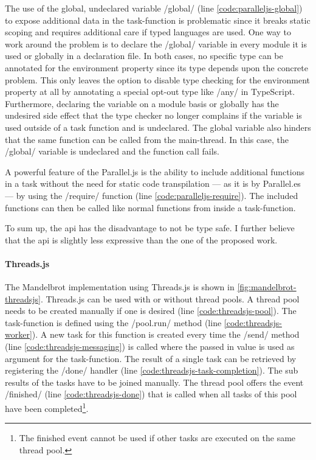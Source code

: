 The use of the global, undeclared variable \javascriptinline/global/ (line \ref{code:paralleljs-global}) to expose additional data in the task-function is problematic since it breaks static scoping and requires additional care if typed languages are used. One way to work around the problem is to declare the \javascriptinline/global/ variable in every module it is used or globally in a declaration file. In both cases, no specific type can be annotated for the environment property since its type depends upon the concrete problem. This only leaves the option to disable type checking for the environment property at all by annotating a special opt-out type like \javascriptinline/any/ in TypeScript. Furthermore, declaring the variable on a module basis or globally has the undesired side effect that the type checker no longer complains if the variable is used outside of a task function and is undeclared. The global variable also hinders that the same function can be called from the main-thread. In this case, the \javascriptinline/global/ variable is undeclared and the function call fails.

A powerful feature of the Parallel.js is the ability to include additional functions in a task without the need for static code transpilation --- as it is by Parallel.es --- by using the \javascriptinline/require/ function (line \ref{code:paralleljs-require}). The included functions can then be called like normal functions from inside a task-function. 

To sum up, the api has the disadvantage to not be type safe. I further believe that the api is slightly less expressive than the one of the proposed work.

\paragraph{Threads.js}
 The Mandelbrot implementation using Threads.js is shown in \cref{fig:mandelbrot-threadsjs}. Threads.js can be used with or without thread pools. A thread pool needs to be created manually if one is desired (line \ref{code:threadsjs-pool}). The task-function is defined using the \javascriptinline/pool.run/ method (line \ref{code:threadsjs-worker}). A new task for this function is created every time the \javascriptinline/send/ method (line \ref{code:threadsjs-messaging}) is called where the passed in value is used as argument for the task-function. The result of a single task can be retrieved by registering the \javascriptinline/done/ handler (line \ref{code:threadsjs-task-completion}). The sub results of the tasks have to be joined manually. The thread pool offers the event \javascriptinline/finished/ (line \ref{code:threadsjs-done}) that is called when all tasks of this pool have been completed\footnote{The finished event cannot be used if other tasks are executed on the same thread pool.}.

